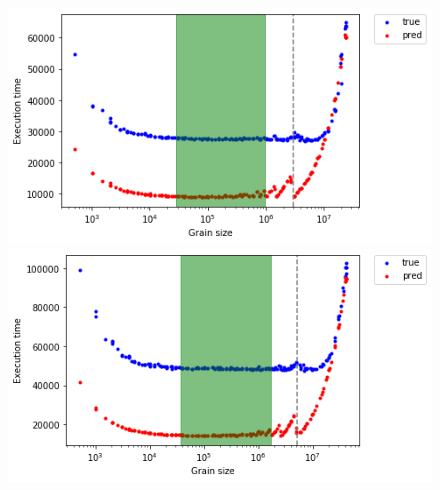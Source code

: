 \begin{figure}[H]
{		\label{fig56:c}}
	\hfill
	{\centering\includegraphics[scale=.4]{images/hpx_for_loop/blazemark/100000/range/marvin_pred_4855_8_10_500.png}	
	\label{fig56:f}}
	{\centering\includegraphics[scale=.4]{images/hpx_for_loop/blazemark/100000/range/marvin_pred_6420_8_10_500.png}	
}
\end{figure}
